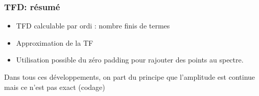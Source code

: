 \documentclass{beamer}
\begin{document}
\begin{frame}
\frametitle{TFD: résumé}
\begin{itemize}
\item TFD calculable par ordi : nombre finis de termes 
\vspace{0.3cm}
\item<2-> Approximation de la TF
\vspace{0.3cm}
\item<3-> Utilisation possible du zéro padding pour rajouter des points au spectre.

\end{itemize}
\vspace{1cm}
Dans tous ces développements, on part du principe que l'amplitude est continue mais ce n'est pas exact (codage)
\end{frame}
\end{document}
